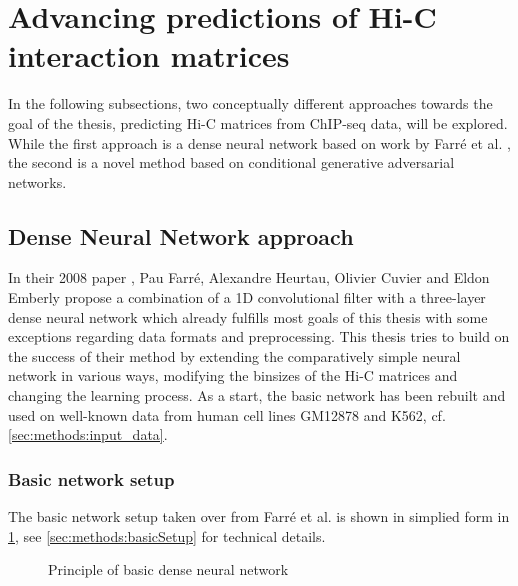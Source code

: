 \section{Advancing predictions of Hi-C interaction matrices}
In the following subsections, two conceptually different approaches towards the goal of the thesis,
predicting Hi-C matrices from ChIP-seq data, will be explored.
While the first approach is a dense neural network based on work by Farr\'e et al. \cite{Farre2018a},
the second is a novel method based on conditional generative adversarial networks.

\subsection{Dense Neural Network approach}\label{sec:DNNapproach}
In their 2008 paper \cite{Farre2018a}, Pau Farr\'e, Alexandre Heurtau, Olivier Cuvier and Eldon Emberly
propose a combination of a 1D convolutional filter with a three-layer dense neural network 
which already fulfills most goals of this thesis with some exceptions regarding data formats and preprocessing.
This thesis tries to build on the success of their method by extending the comparatively simple neural network
in various ways, modifying the binsizes of the Hi-C matrices and changing the learning process.
As a start, the basic network has been rebuilt and used on well-known data from human cell lines GM12878 and K562, cf. \cref{sec:methods:input_data}.

\subsubsection{Basic network setup} \label{sec:improve:basicNetwork}
The basic network setup taken over from Farr\'e et al. \cite{Farre2018a} is shown in simplied form in \cref{fig:improve:priciple_basic_dnn},
see \cref{sec:methods:basicSetup} for technical details.
\begin{figure}[hbp]
    \small
    \centering
    \caption{Principle of basic dense neural network}
    \label{fig:improve:priciple_basic_dnn}
\end{figure}

